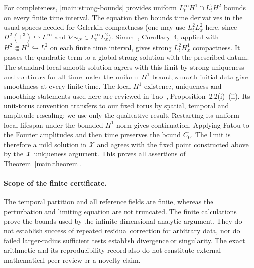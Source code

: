 For completeness, \eqref{main:strong-bounds} provides uniform
$L^\infty_tH^1\cap L^2_tH^2$ bounds on every finite time interval.
The equation then bounds time derivatives in the usual spaces needed for
Galerkin compactness (one may use $L^2_tL^2_x$ here, since
$H^2(\mathbb T^3)\hookrightarrow L^\infty$ and
$\nabla u_N\in L^\infty_tL^2_x$).
Simon~\cite{Simon}, Corollary~4, applied with $H^2\Subset H^1\hookrightarrow L^2$
on each finite time interval, gives strong $L^2_tH^1_x$ compactness.
It passes the quadratic term to a global strong solution with the prescribed datum.
The standard local smooth solution agrees with this limit by strong
uniqueness and continues for all time under the uniform $H^1$ bound;
smooth initial data give smoothness at every finite time. The local $H^1$
existence, uniqueness and smoothing statements used here are reviewed in
Tao~\cite{Tao2009}, Proposition~2.2(i)--(ii). Its unit-torus convention
transfers to our fixed torus by spatial, temporal and amplitude rescaling;
we use only the qualitative result. Restarting its uniform local lifespan
under the bounded $H^1$ norm gives continuation. Applying Fatou
to the Fourier amplitudes and then time preserves the bound $C_0$.
The limit is therefore a mild solution in $\mathcal X$ and agrees with
the fixed point constructed above by the $\mathcal X$ uniqueness argument.
This proves all assertions of Theorem~\ref{main:theorem}.

\paragraph{Scope of the finite certificate.}
The temporal partition and all reference fields are finite, whereas the
perturbation and limiting equation are not truncated. The finite calculations
prove the bounds used by the infinite-dimensional analytic argument.
They do not establish success of repeated residual correction for arbitrary
data, nor do failed larger-radius sufficient tests establish divergence or
singularity. The exact arithmetic and its reproducibility record also do
not constitute external mathematical peer review or a novelty claim.
